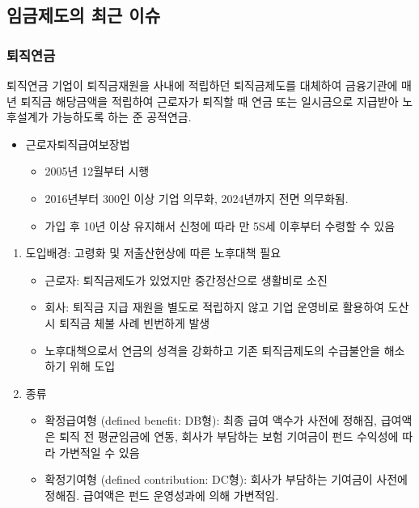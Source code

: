 \documentclass[aspectratio=169,xcolor=dvipsnames,handout]{beamer}
\begin{document}
\subsection{임금제도의 최근 이슈}%

\begin{frame}[allowframebreaks]
    \frametitle{퇴직연금}
    \begin{block}{퇴직연금}
        기업이 퇴직금재원을 사내에 적립하던 퇴직금제도를 대체하여 금융기관에 매년 퇴직금 해당금액을 적립하여 근로자가 퇴직할 때 연금 또는 일시금으로 지급받아 노후설계가 가능하도록 하는 준 공적연금.
    \end{block}
    \begin{itemize}[<+->]
        \item 근로자퇴직급여보장법 
        \begin{itemize}[<+->]
            \item 2005년 12월부터 시행
            \item 2016년부터 300인 이상 기업 의무화, 2024년까지 전면 의무화됨. 
            \item 가입 후 10년 이상 유지해서 신청에 따라 만 5S세 이후부터 수령할 수 있음
        \end{itemize}
    \end{itemize}
    \framebreak%
    \begin{enumerate}[<+->]
        \item 도입배경: 고령화 및 저출산현상에 따른 노후대책 필요
        \begin{itemize}[<+->]
            \item 근로자: 퇴직금제도가 있었지만 중간정산으로 생활비로 소진
            \item 회사: 퇴직금 지급 재원을 별도로 적립하지 않고 기업 운영비로 활용하여 도산 시 퇴직금 체불 사례 빈번하게 발생
            \item 노후대책으로서 연금의 성격을 강화하고 기존 퇴직금제도의 수급불안을 해소하기 위해 도입
        \end{itemize}
    \framebreak%
        \item 종류
        \begin{itemize}[<+->]
            \item 확정급여형 (defined benefit: DB형): 최종 급여 액수가 사전에 정해짐, 급여액은 퇴직 전 평균임금에 연동, 회사가 부담하는 보험 기여금이 펀드 수익성에 따라 가변적일 수 있음
            \item 확정기여형 (defined contribution: DC형): 회사가 부담하는 기여금이 사전에 정해짐. 급여액은 펀드 운영성과에 의해 가변적임.

\end{itemize}
\end{enumerate}
\end{frame}
\end{document}
